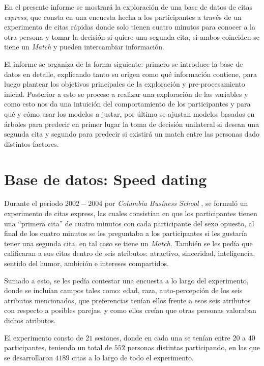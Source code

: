 En el presente informe se mostrará la exploración de una base de datos de citas \textit{express}, que consta en una encuesta hecha a los participantes a través de un experimento de citas rápidas donde solo tienen cuatro minutos para conocer a la otra persona y tomar la decisión si quiere una segunda cita, si ambos coinciden se tiene un \textit{Match} y pueden intercambiar información.


El informe se organiza de la forma siguiente: primero se introduce la base de datos en detalle, explicando tanto su origen como qué información contiene, para luego plantear los objetivos principales de la exploración y pre-procesamiento inicial. Posterior a esto se procese a realizar una exploración de las variables y como esto nos da una intuición del comportamiento de los participantes y para qué y cómo usar los modelos a justar, por último se ajustan modelos basados en árboles para predecir en primer lugar la toma de decisión unilateral si desean una segunda cita y segundo para predecir si existirá un match entre las personas dado distintos factores.


\section{Base de datos: Speed dating}

Durante el periodo $2002-2004$ por \textit{Columbia Business School} \cite{fisman2006gender}, se formuló un experimento de citas express, las cuales consistían en que los participantes tienen una ``primera cita'' de cuatro minutos con cada participante del sexo opuesto, al final de los cuatro minutos se les preguntaba a los participantes si les gustaría tener una segunda cita, en tal caso se tiene un \textit{Match}. También se les pedía que calificaran a sus citas dentro de seis atributos: atractivo, sinceridad, inteligencia, sentido del humor, ambición e intereses compartidos.

Sumado a esto, se les pedía contestar una encuesta a lo largo del experimento, donde se incluían campos tales como: edad, raza, auto-percepción de los seis atributos mencionados, que preferencias tenían ellos frente a esos seis atributos con respecto a posibles parejas, y como ellos creían que otras personas valoraban dichos atributos.

El experimento consto de $21$ sesiones, donde en cada una se tenían entre $20$ a $40$ participantes, teniendo un total de $552$ personas distintas participando, en las que se desarrollaron $4189$ citas a lo largo de todo el experimento.

